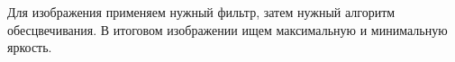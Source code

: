 \solutionSection

Для изображения применяем нужный фильтр, затем нужный алгоритм обесцвечивания. В итоговом изображении ищем максимальную и минимальную яркость.

\codeExample

